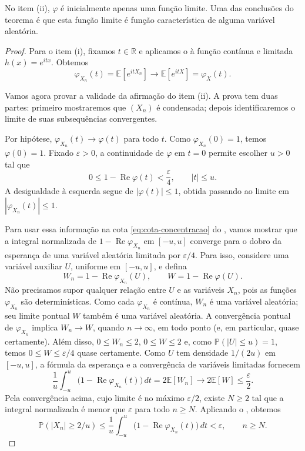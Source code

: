 \documentclass[12pt,portuguese]{article}
\theoremstyle{definition}
\theoremstyle{plainexercise}
\theoremstyle{starredexercise}
\theoremstyle{definition}
\begin{document}
No item (ii), $\varphi$ é inicialmente apenas uma função limite. Uma das conclusões
do teorema é que esta função limite é função característica de alguma variável aleatória.

\begin{proof}
Para o item (i), fixamos $t\in\mathbb{R}$ e aplicamos o
 à função contínua e limitada
$h(x)=e^{itx}$. Obtemos
\[
\varphi_{X_n}(t)=\mathbb{E}[e^{itX_n}]
\longrightarrow
\mathbb{E}[e^{itX}]=\varphi_X(t).
\]

\bigskip

Vamos agora provar a validade da afirmação do item (ii). A prova tem duas partes: primeiro mostraremos que
$(X_n)$ é condensada; depois identificaremos o limite de suas subsequências
convergentes.

Por hipótese, $\varphi_{X_n}(t)\to\varphi(t)$ para todo $t$. Como
$\varphi_{X_n}(0)=1$, temos $\varphi(0)=1$. Fixado $\varepsilon>0$, a
continuidade de $\varphi$ em $t=0$ permite escolher $u>0$ tal que
\[
0\leqslant1-\operatorname{Re}\varphi(t)<\frac{\varepsilon}{4},
\qquad |t|\leqslant u.
\]
A desigualdade à esquerda segue de $|\varphi(t)|\leqslant1$, obtida passando
ao limite em $|\varphi_{X_n}(t)|\leqslant1$.

Para usar essa informação na cota \eqref{eq:cota-concentracao} do
, vamos mostrar que a integral normalizada de
$1-\operatorname{Re}\varphi_{X_n}$ em $[-u,u]$ converge para o dobro da
esperança de uma variável aleatória limitada por $\varepsilon/4$. Para isso,
considere uma variável auxiliar $U$, uniforme em $[-u,u]$, e defina
\[
W_n=1-\operatorname{Re}\varphi_{X_n}(U),
\qquad
W=1-\operatorname{Re}\varphi(U).
\]
Não precisamos supor qualquer relação entre $U$ e as variáveis $X_n$, pois
as funções $\varphi_{X_n}$ são determinísticas. Como cada $\varphi_{X_n}$ é contínua,
$W_n$ é uma variável aleatória; seu limite pontual $W$ também é uma variável
aleatória. A convergência pontual de $\varphi_{X_n}$ implica $W_n\to W$,
quando $n\to\infty$, em todo ponto (e, em particular, quase certamente). Além
disso, $0\leqslant W_n\leqslant2$, $0\leqslant W\leqslant2$ e, como
$\mathbb{P}(|U|\leqslant u)=1$, temos $0\leqslant W\leqslant\varepsilon/4$
quase certamente. Como $U$
tem densidade $1/(2u)$ em $[-u,u]$, a fórmula da esperança e a convergência
de variáveis limitadas fornecem
\[
\frac{1}{u}\int_{-u}^{u}
\bigl(1-\operatorname{Re}\varphi_{X_n}(t)\bigr)\,dt
=2\mathbb{E}[W_n]
\longrightarrow2\mathbb{E}[W]\leqslant\frac{\varepsilon}{2}.
\]
Pela convergência acima, cujo limite é no máximo $\varepsilon/2$, existe
$N\geqslant2$ tal que a integral normalizada é menor que $\varepsilon$ para
todo $n\geqslant N$. Aplicando o , obtemos
\[
\mathbb{P}(|X_n|\geqslant2/u)
\leqslant
\frac{1}{u}\int_{-u}^{u}
\bigl(1-\operatorname{Re}\varphi_{X_n}(t)\bigr)\,dt
<\varepsilon,
\qquad n\geqslant N.
\]


\end{proof}
\end{document}

